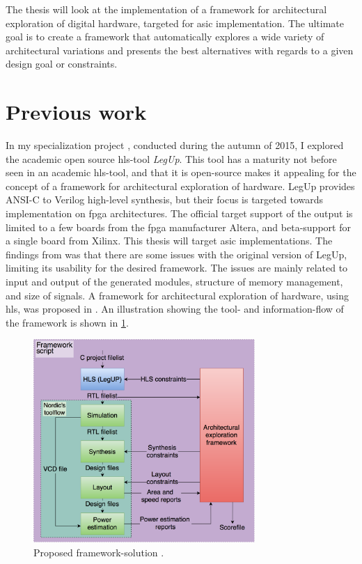 The thesis will look at the implementation of a framework for architectural exploration of digital hardware, targeted for \gls{asic} implementation. The ultimate goal is to create a framework that automatically explores a wide variety of architectural variations and presents the best alternatives with regards to a given design goal or constraints.
\section{Previous work}
In my specialization project \cite{holm2015pro}, conducted during the autumn of 2015, I explored the academic open source \gls{hls}-tool \textit{LegUp}. This tool has a maturity not before seen in an academic \gls{hls}-tool, and that it is open-source makes it appealing for the concept of a framework for architectural exploration of hardware. LegUp provides ANSI-C to Verilog high-level synthesis, but their focus is targeted towards implementation on \gls{fpga} architectures. The official target support of the output is limited to a few boards from the \gls{fpga} manufacturer Altera, and beta-support for a single board from Xilinx. This thesis will target \gls{asic} implementations. The findings from \cite{holm2015pro} was that there are some issues with the original version of LegUp, limiting its usability for the desired framework. The issues are mainly related to input and output of the generated modules, structure of memory management, and size of signals. A framework for architectural exploration of hardware, using \gls{hls}, was proposed in \cite{holm2015pro}. An illustration showing the tool- and information-flow of the framework is shown in \cref{fig:frameworkflow}.

\begin{figure}[hbpt]
\centering
\includegraphics[width=0.75\textwidth]{../figs/Framework.png}
\caption{\label{fig:frameworkflow}Proposed framework-solution \cite{holm2015pro}.}
\end{figure}

